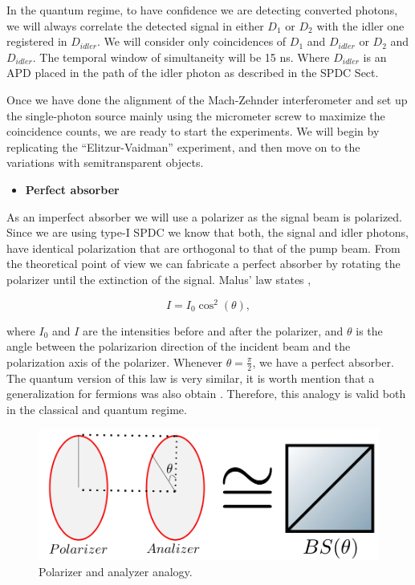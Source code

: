 \documentclass[12pt]{book}
\begin{document}
 In the quantum regime, to have confidence we are detecting converted photons, we will always correlate the detected signal in either $D_{1}$ or $D_{2}$ with the idler one registered in $D_{idler}$. We will consider only coincidences of $D_{1}$ and $D_{idler}$ or $D_{2}$ and $D_{idler}$. The temporal window of simultaneity will be 15 ns. Where $D_{idler}$ is an APD placed in the path of the idler photon as described in the SPDC Sect.




Once we have done the alignment of the Mach-Zehnder interferometer and set up the single-photon source mainly using the micrometer screw to maximize the coincidence counts, we are ready to start the experiments. We will begin by replicating the ``Elitzur-Vaidman'' experiment, and then move on to the variations with semitransparent objects.


\begin{itemize}
\item {\large \textbf{Perfect absorber}}
\end{itemize}
As an imperfect absorber we will use a polarizer as the signal beam is polarized. Since we are using type-I SPDC we know that both, the signal and idler photons, have identical polarization that are orthogonal to that of the pump beam. From the theoretical point of view we can fabricate a perfect absorber by rotating the polarizer until the extinction of the signal. Malus' law states \cite{hecht},

\begin{equation}
I=I_{0} \cos^{2}(\theta),
\end{equation}

where $I_{0}$ and $I$ are the intensities before and after the polarizer, and $\theta$ is the angle between the polarizarion direction of the incident beam and the polarization axis of the polarizer. Whenever $\theta = \frac{\pi}{2}$, we have a perfect absorber. The quantum version of this law is very similar, it is worth mention that a generalization for fermions was also obtain \cite{malus}. Therefore, this analogy is valid both in the classical and quantum regime. 


\begin{figure}[t!]
\centering
\includegraphics[scale=0.3]{images/polarizeranalogy.png}
\caption{Polarizer and analyzer analogy.}
\label{BS and polarizer}
\end{figure}
\end{document}

